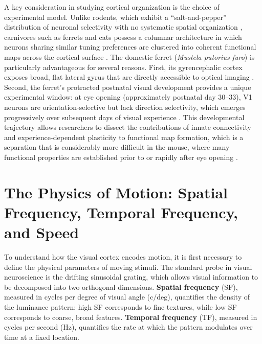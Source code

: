 \documentclass{brandeis-thesis3.3}
\begin{document}
A key consideration in studying cortical organization is the choice of
experimental model. Unlike rodents, which exhibit a ``salt-and-pepper''
distribution of neuronal selectivity with no systematic spatial
organization \citep{Ohki2005, Ohki2007}, carnivores such as ferrets
and cats possess a columnar architecture in which neurons sharing
similar tuning preferences are clustered into coherent functional maps
across the cortical surface \citep{Bonhoeffer1991, Weliky1996}.
The domestic ferret (\textit{Mustela putorius furo}) is particularly
advantageous for several reasons. First, its gyrencephalic cortex
exposes broad, flat lateral gyrus that are directly accessible to optical imaging
\citep{Issa1999}. Second, the ferret's protracted postnatal visual
development provides a unique experimental window: at eye opening
(approximately postnatal day 30--33), V1 neurons are
orientation-selective but lack direction selectivity, which emerges
progressively over subsequent days of visual experience
\citep{Clemens2012, Li2008}. This developmental trajectory allows
researchers to dissect the contributions of innate connectivity and
experience-dependent plasticity to functional map formation, which is a
separation that is considerably more difficult in the mouse, where many
functional properties are established prior to or rapidly after eye
opening \citep{Yu2025}.

\section{The Physics of Motion: Spatial Frequency,
  Temporal Frequency, and Speed}

To understand how the visual cortex encodes motion, it is first
necessary to define the physical parameters of moving stimuli. The
standard probe in visual neuroscience is the drifting sinusoidal
grating, which allows visual information to be decomposed into two
orthogonal dimensions. \textbf{Spatial frequency} (SF), measured in
cycles per degree of visual angle ($\text{c/deg}$), quantifies the
density of the luminance pattern: high SF corresponds to fine textures,
while low SF corresponds to coarse, broad features. \textbf{Temporal
frequency} (TF), measured in cycles per second ($\text{Hz}$),
quantifies the rate at which the pattern modulates over time at a fixed
location.
\end{document}
